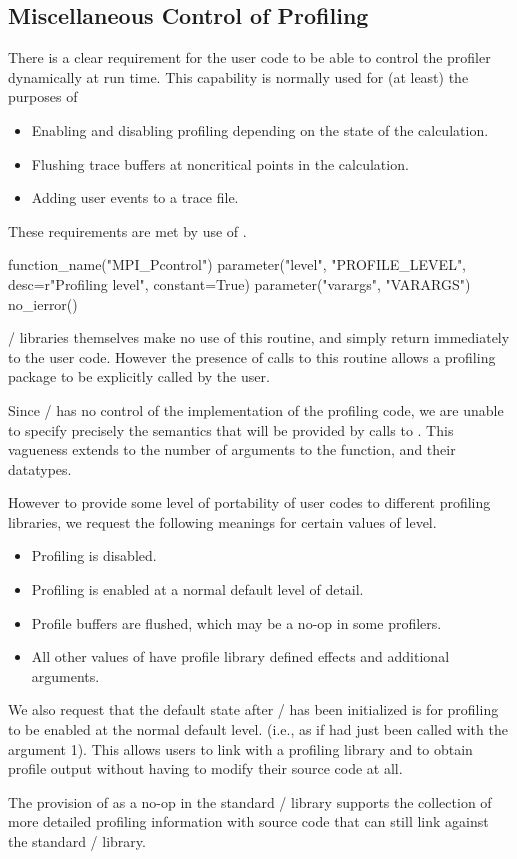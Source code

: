 \subsection{Miscellaneous Control of Profiling}

There is a clear requirement for the user code to be able to control the
profiler dynamically at run time.  This capability is normally used for (at
least) the purposes of
\begin{itemize}
\item Enabling and disabling profiling depending on the state of the
  calculation.
\item Flushing trace buffers at noncritical points in the calculation.
\item Adding user events to a trace file.
\end{itemize}
These requirements are met by use of .

\begin{mpi-binding}
    function_name("MPI_Pcontrol")
    parameter("level", "PROFILE_LEVEL", desc=r"Profiling level", constant=True)
    parameter("varargs", "VARARGS")
    no_ierror()
\end{mpi-binding}

\MPI/ libraries themselves make no use of this routine, and simply return
immediately to the user code.  However the presence of calls to this
routine allows a profiling package to be explicitly called by the user.

Since \MPI/ has no control of the implementation of the profiling code, we
are unable to specify precisely the semantics that  will be provided by
calls to .  This vagueness extends to the number of
arguments to the function, and their datatypes.

However to provide some level of portability of user codes to different
profiling libraries, we request the following meanings for certain values
of level.
\begin{itemize}
\item{}
  Profiling is disabled.
\item{}
  Profiling is enabled at a normal default level of detail.
\item{}
  Profile buffers are flushed, which may be a no-op in some profilers.
\item{All other values of }
  have profile library defined effects and additional arguments.
\end{itemize}

We also request that the default state after \MPI/ has been
initialized is for profiling to be enabled at the normal default level.  (i.e.,
as if  had just been called with the argument 1).
This allows users to link with a profiling library and to obtain profile
output without having to modify their source code at all.

The provision of  as a no-op in the standard \MPI/
library supports the collection of more detailed profiling information with
source code that can still link against the standard \MPI/ library.
